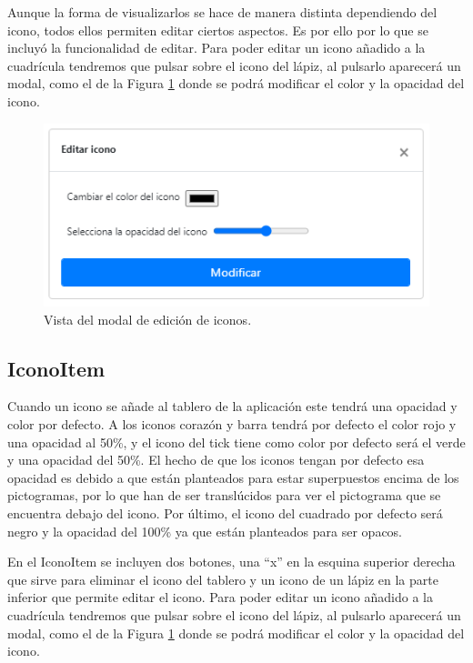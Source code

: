  
Aunque la forma de visualizarlos se hace de manera distinta dependiendo del icono, todos ellos permiten editar ciertos aspectos. Es por ello por lo que se incluyó la funcionalidad de editar. Para poder editar un icono añadido a la cuadrícula tendremos que pulsar sobre el icono del lápiz, al pulsarlo aparecerá un modal, como el de la Figura \ref{fig:modalpictoitem} donde se podrá modificar el color y la opacidad del icono.  

\begin{figure}[h!]
	\centering
	\includegraphics[width=0.7\linewidth]{Imagenes/Bitmap/modalPictoItem}
	\caption{Vista del modal de edición de iconos.}
	\label{fig:modalpictoitem}
\end{figure}

\subsection{IconoItem}

Cuando un icono se añade al tablero de la aplicación este tendrá una opacidad y color por defecto. A los iconos corazón y barra tendrá por defecto el color rojo y una opacidad al 50\%, y el icono del tick tiene como color por defecto será el verde y una opacidad del 50\%. El hecho de que los iconos tengan por defecto esa opacidad es debido a que están planteados para estar superpuestos encima de los pictogramas, por lo que han de ser translúcidos para ver el pictograma que se encuentra debajo del icono. Por último, el icono del cuadrado por defecto será negro y la opacidad del 100\% ya que están planteados para ser opacos.

En el IconoItem se incluyen dos botones, una “x” en la esquina superior derecha que sirve para eliminar el icono del tablero y un icono de un lápiz en la parte inferior que permite editar el icono. Para poder editar un icono añadido a la cuadrícula tendremos que pulsar sobre el icono del lápiz, al pulsarlo aparecerá un modal, como el de la Figura \ref{fig:modalpictoitem} donde se podrá modificar el color y la opacidad del icono.

